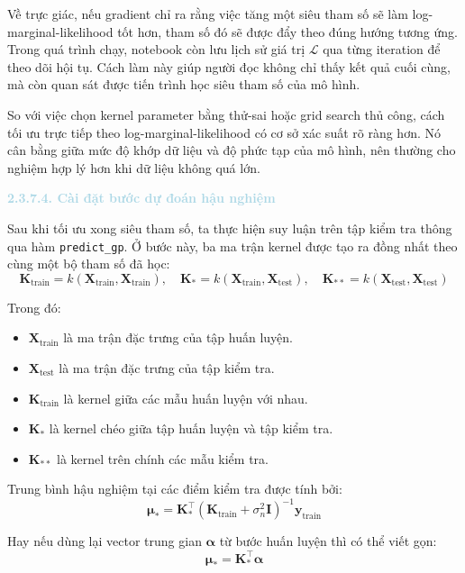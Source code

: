Về trực giác, nếu gradient chỉ ra rằng việc tăng một siêu tham số sẽ làm log-marginal-likelihood tốt hơn, tham số đó sẽ được đẩy theo đúng hướng tương ứng. Trong quá trình chạy, notebook còn lưu lịch sử giá trị $\mathcal{L}$ qua từng iteration để theo dõi hội tụ. Cách làm này giúp người đọc không chỉ thấy kết quả cuối cùng, mà còn quan sát được tiến trình học siêu tham số của mô hình.

So với việc chọn kernel parameter bằng thử-sai hoặc grid search thủ công, cách tối ưu trực tiếp theo log-marginal-likelihood có cơ sở xác suất rõ ràng hơn. Nó cân bằng giữa mức độ khớp dữ liệu và độ phức tạp của mô hình, nên thường cho nghiệm hợp lý hơn khi dữ liệu không quá lớn.

\noindent\textcolor{lightblue}{\textbf{2.3.7.4. Cài đặt bước dự đoán hậu nghiệm}}

Sau khi tối ưu xong siêu tham số, ta thực hiện suy luận trên tập kiểm tra thông qua hàm \texttt{predict\_gp}. Ở bước này, ba ma trận kernel được tạo ra đồng nhất theo cùng một bộ tham số đã học:
\begin{equation}
    \mathbf{K}_{\mathrm{train}} = k(\mathbf{X}_{\mathrm{train}}, \mathbf{X}_{\mathrm{train}}), \quad
    \mathbf{K}_{*} = k(\mathbf{X}_{\mathrm{train}}, \mathbf{X}_{\mathrm{test}}), \quad
    \mathbf{K}_{**} = k(\mathbf{X}_{\mathrm{test}}, \mathbf{X}_{\mathrm{test}})
\end{equation}

Trong đó:
\begin{itemize}
    \item $\mathbf{X}_{\mathrm{train}}$ là ma trận đặc trưng của tập huấn luyện.
    \item $\mathbf{X}_{\mathrm{test}}$ là ma trận đặc trưng của tập kiểm tra.
    \item $\mathbf{K}_{\mathrm{train}}$ là kernel giữa các mẫu huấn luyện với nhau.
    \item $\mathbf{K}_{*}$ là kernel chéo giữa tập huấn luyện và tập kiểm tra.
    \item $\mathbf{K}_{**}$ là kernel trên chính các mẫu kiểm tra.
\end{itemize}

Trung bình hậu nghiệm tại các điểm kiểm tra được tính bởi:
\begin{equation}
    \boldsymbol{\mu}_{*} = \mathbf{K}_{*}^{\top}(\mathbf{K}_{\mathrm{train}} + \sigma_n^2\mathbf{I})^{-1}\mathbf{y}_{\mathrm{train}}
\end{equation}

Hay nếu dùng lại vector trung gian $\boldsymbol{\alpha}$ từ bước huấn luyện thì có thể viết gọn:
\begin{equation}
    \boldsymbol{\mu}_{*} = \mathbf{K}_{*}^{\top}\boldsymbol{\alpha}
\end{equation}

